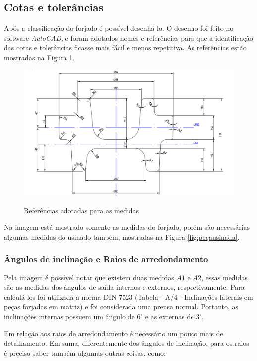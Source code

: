 \documentclass[deposito, acronym, symbols]{fei}
\begin{document}
\subsection{Cotas e tolerâncias}

Após a classificação do forjado é possível desenhá-lo. O desenho foi feito no software \textit{AutoCAD}, e foram adotados nomes e referências para que a identificação das cotas e tolerâncias ficasse mais fácil e menos repetitiva. As referências estão mostradas na Figura \ref{fig:refmed}.

\begin{figure}[!htp]
    \centering
    \caption{Referências adotadas para as medidas}
    \includegraphics[width=0.8\linewidth]{Imagens/ref medidas branco.png}
    \label{fig:refmed}
\end{figure}

Na imagem está mostrado somente as medidas do forjado, porém são necessárias algumas medidas do usinado também, mostradas na Figura \ref{fig:peçausinada}.

\subsubsection{Ângulos de inclinação e Raios de arredondamento}

Pela imagem é possível notar que existem duas medidas $A1$ e $A2$, essas medidas são as medidas dos ângulos de saída internos e externos, respectivamente. Para calculá-los foi utilizada a norma DIN 7523 (Tabela - A/4 - Inclinações laterais em peças forjadas em matriz) e foi considerada uma prensa normal. Portanto, as inclinações internas possuem um ângulo de $6^{\circ}$ e as externas de $3^{\circ}$.

Em relação aos raios de arredondamento é necessário um pouco mais de detalhamento. Em suma, diferentemente dos ângulos de inclinação, para os raios é preciso saber também algumas outras coisas, como: 
\end{document}
